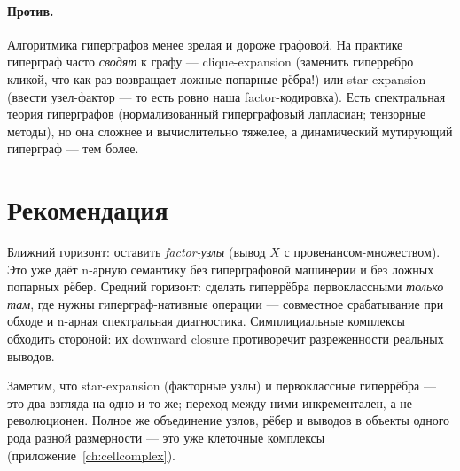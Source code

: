 \paragraph{Против.} Алгоритмика гиперграфов менее зрелая и дороже графовой. На
практике гиперграф часто \emph{сводят} к графу — clique-expansion (заменить
гиперребро кликой, что как раз возвращает ложные попарные рёбра!) или
star-expansion (ввести узел-фактор — то есть ровно наша factor-кодировка). Есть
спектральная теория гиперграфов (нормализованный гиперграфовый лапласиан; тензорные
методы), но она сложнее и вычислительно тяжелее, а динамический мутирующий гиперграф
— тем более.

\section{Рекомендация}

\begin{principle}
Ближний горизонт: оставить \emph{factor-узлы} (вывод $X$ с провенансом-множеством).
Это уже даёт n-арную семантику без гиперграфовой машинерии и без ложных попарных
рёбер. Средний горизонт: сделать гиперрёбра первоклассными \emph{только там}, где
нужны гиперграф-нативные операции — совместное срабатывание при обходе и n-арная
спектральная диагностика. Симплициальные комплексы обходить стороной: их downward
closure противоречит разреженности реальных выводов.
\end{principle}

Заметим, что star-expansion (факторные узлы) и первоклассные гиперрёбра — это два
взгляда на одно и то же; переход между ними инкрементален, а не революционен.
Полное же объединение узлов, рёбер и выводов в объекты одного рода разной
размерности — это уже клеточные комплексы (приложение~\ref{ch:cellcomplex}).
